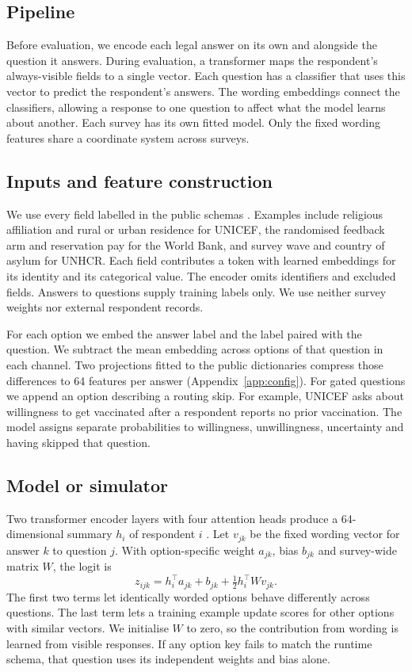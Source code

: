 \documentclass{article}
\newcommand{\code}[1]{\texttt{\detokenize{#1}}}
\begin{document}
\subsection{Pipeline}
Before evaluation, we encode each legal answer on its own and alongside the question it answers. During evaluation, a transformer maps the respondent's always-visible fields to a single vector. Each question has a classifier that uses this vector to predict the respondent's answers. The wording embeddings connect the classifiers, allowing a response to one question to affect what the model learns about another. Each survey has its own fitted model. Only the fixed wording features share a coordinate system across surveys.

\subsection{Inputs and feature construction}
We use every field labelled \code{GIVEN} in the public schemas \citep{bench}. Examples include religious affiliation and rural or urban residence for UNICEF, the randomised feedback arm and reservation pay for the World Bank, and survey wave and country of asylum for UNHCR. Each field contributes a token with learned embeddings for its identity and its categorical value. The encoder omits identifiers and excluded fields. Answers to \code{PREDICT} questions supply training labels only. We use neither survey weights nor external respondent records.

For each option we embed the answer label and the label paired with the question. We subtract the mean embedding across options of that question in each channel. Two projections fitted to the public dictionaries compress those differences to 64 features per answer (Appendix~\ref{app:config}). For gated questions we append an option describing a routing skip. For example, UNICEF asks about willingness to get vaccinated after a respondent reports no prior vaccination. The model assigns separate probabilities to willingness, unwillingness, uncertainty and having skipped that question.

\subsection{Model or simulator}
Two transformer encoder layers with four attention heads produce a 64-dimensional summary $h_i$ of respondent $i$ \citep{attention}. Let $v_{jk}$ be the fixed wording vector for answer $k$ to question $j$. With option-specific weight $a_{jk}$, bias $b_{jk}$ and survey-wide matrix $W$, the logit is
\begin{equation}
 z_{ijk}=h_i^\top a_{jk}+b_{jk}+\tfrac12 h_i^\top Wv_{jk}.
 \label{eq:readout}
\end{equation}
The first two terms let identically worded options behave differently across questions. The last term lets a training example update scores for other options with similar vectors. We initialise $W$ to zero, so the contribution from wording is learned from visible responses. If any option key fails to match the runtime schema, that question uses its independent weights and bias alone.
\end{document}
